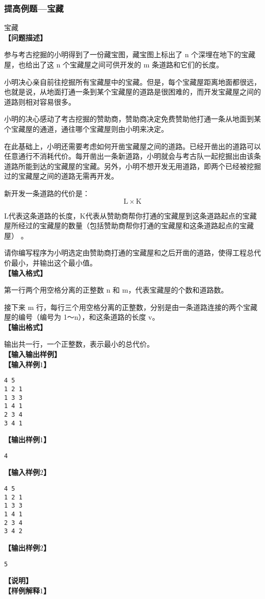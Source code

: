 \subsubsection{提高例题---宝藏}
\begin{example}宝藏\\
	\textbf{【问题描述】}

	参与考古挖掘的小明得到了一份藏宝图，藏宝图上标出了 n 个深埋在地下的宝藏屋，也给出了这 n 个宝藏屋之间可供开发的 m 条道路和它们的长度。

	小明决心亲自前往挖掘所有宝藏屋中的宝藏。但是，每个宝藏屋距离地面都很远， 也就是说，从地面打通一条到某个宝藏屋的道路是很困难的，而开发宝藏屋之间的道路则相对容易很多。

	小明的决心感动了考古挖掘的赞助商，赞助商决定免费赞助他打通一条从地面到某个宝藏屋的通道，通往哪个宝藏屋则由小明来决定。

	在此基础上，小明还需要考虑如何开凿宝藏屋之间的道路。已经开凿出的道路可以任意通行不消耗代价。每开凿出一条新道路，小明就会与考古队一起挖掘出由该条道路所能到达的宝藏屋的宝藏。另外，小明不想开发无用道路，即两个已经被挖掘过的宝藏屋之间的道路无需再开发。

	新开发一条道路的代价是：
	\begin{equation*}\mathrm{L} \times \mathrm{K}\end{equation*}

	L代表这条道路的长度，K代表从赞助商帮你打通的宝藏屋到这条道路起点的宝藏屋所经过的宝藏屋的数量（包括赞助商帮你打通的宝藏屋和这条道路起点的宝藏屋） 。

	请你编写程序为小明选定由赞助商打通的宝藏屋和之后开凿的道路，使得工程总代价最小，并输出这个最小值。
	\\
	\textbf{【输入格式】}

	第一行两个用空格分离的正整数 n 和 m，代表宝藏屋的个数和道路数。

	接下来 m 行，每行三个用空格分离的正整数，分别是由一条道路连接的两个宝藏屋的编号（编号为 1～n），和这条道路的长度 v。
	\ \\
	\textbf{【输出格式】}

	输出共一行，一个正整数，表示最小的总代价。
	\\
	\textbf{【输入输出样例】}
	\ \\
	\textbf{【输入样例$1$】}
	\begin{verbatim}
4 5 
1 2 1 
1 3 3 
1 4 1 
2 3 4 
3 4 1 
\end{verbatim}
	\textbf{【输出样例$1$】}
	\begin{verbatim}
4
\end{verbatim}
	\textbf{【输入样例$2$】}
	\begin{verbatim}
4 5 
1 2 1 
1 3 3 
1 4 1 
2 3 4 
3 4 2  
\end{verbatim}
	\textbf{【输出样例$2$】}
	\begin{verbatim}
5
\end{verbatim}
	\textbf{【说明】}
	\ \\
	\textbf{【样例解释$1$】}


\end{example}
